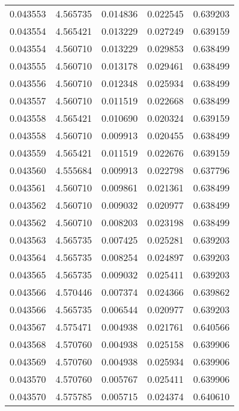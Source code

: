 \begin{tabular}{lrrrr}
0.043553    &  4.565735 &  0.014836 &  0.022545 &             0.639203 \\
0.043554    &  4.565421 &  0.013229 &  0.027249 &             0.639159 \\
0.043554    &  4.560710 &  0.013229 &  0.029853 &             0.638499 \\
0.043555    &  4.560710 &  0.013178 &  0.029461 &             0.638499 \\
0.043556    &  4.560710 &  0.012348 &  0.025934 &             0.638499 \\
0.043557    &  4.560710 &  0.011519 &  0.022668 &             0.638499 \\
0.043558    &  4.565421 &  0.010690 &  0.020324 &             0.639159 \\
0.043558    &  4.560710 &  0.009913 &  0.020455 &             0.638499 \\
0.043559    &  4.565421 &  0.011519 &  0.022676 &             0.639159 \\
0.043560    &  4.555684 &  0.009913 &  0.022798 &             0.637796 \\
0.043561    &  4.560710 &  0.009861 &  0.021361 &             0.638499 \\
0.043562    &  4.560710 &  0.009032 &  0.020977 &             0.638499 \\
0.043562    &  4.560710 &  0.008203 &  0.023198 &             0.638499 \\
0.043563    &  4.565735 &  0.007425 &  0.025281 &             0.639203 \\
0.043564    &  4.565735 &  0.008254 &  0.024897 &             0.639203 \\
0.043565    &  4.565735 &  0.009032 &  0.025411 &             0.639203 \\
0.043566    &  4.570446 &  0.007374 &  0.024366 &             0.639862 \\
0.043566    &  4.565735 &  0.006544 &  0.020977 &             0.639203 \\
0.043567    &  4.575471 &  0.004938 &  0.021761 &             0.640566 \\
0.043568    &  4.570760 &  0.004938 &  0.025158 &             0.639906 \\
0.043569    &  4.570760 &  0.004938 &  0.025934 &             0.639906 \\
0.043570    &  4.570760 &  0.005767 &  0.025411 &             0.639906 \\
0.043570    &  4.575785 &  0.005715 &  0.024374 &             0.640610 \\

\end{tabular}
